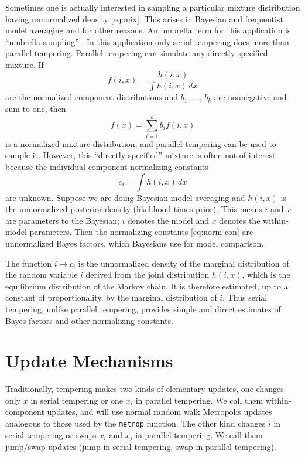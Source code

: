 \documentclass[11pt]{article}
\begin{document}
Sometimes one is actually interested in sampling a particular mixture
distribution having unnormalized density \eqref{eq:mix}.  This arises
in Bayesian and frequentist model averaging and for other reasons.
An umbrella term for this application is ``umbrella sampling''
\citep{torrie-valleau}.  In this application only serial tempering does more
than parallel tempering.  Parallel tempering can simulate any directly
specified mixture.  If
$$
   f(i, x) = \frac{h(i, x)}{\int h(i, x) \, d x}
$$
are the normalized component distributions and $b_1$, $\dots$, $b_k$ are
nonnegative and sum to one, then
$$
   f(x) = \sum_{i = 1}^k b_i f(i, x)
$$
is a normalized mixture distribution, and parallel tempering can be used
to sample it.  However, this ``directly specified'' mixture is often not
of interest because the individual component normalizing constants
\begin{equation} \label{eq:norm-con}
   c_i = \int h(i, x) \, d x
\end{equation}
are unknown.  Suppose we are doing Bayesian model
averaging and $h(i, x)$ is the unnormalized posterior density (likelihood times
prior).  This means $i$ and $x$ are parameters to the Bayesian; $i$ denotes
the model and $x$ denotes the within-model parameters.  Then the normalizing
constants \eqref{eq:norm-con} are unnormalized Bayes factors, which Bayesians
use for model comparison.

The function $i \mapsto c_i$ is the unnormalized density of the marginal
distribution of the random
variable $i$ derived from the joint distribution $h(i, x)$, which is the
equilibrium distribution of the Markov chain.  It is therefore estimated,
up to a constant of proportionality, by the marginal distribution of $i$.
Thus serial tempering, unlike parallel tempering, provides simple and direct
estimates of Bayes factors and other normalizing constants.

\section{Update Mechanisms}

Traditionally, tempering makes two kinds of elementary updates, one changes
only $x$ in serial tempering or one $x_i$ in parallel tempering.  We call
them within-component updates, and will use normal random walk Metropolis
updates analogous to those used by the \texttt{metrop} function.  The other
kind changes $i$ in serial tempering or swaps $x_i$ and $x_j$ in parallel
tempering.  We call them jump/swap updates (jump in serial tempering, swap
in parallel tempering).
\end{document}
